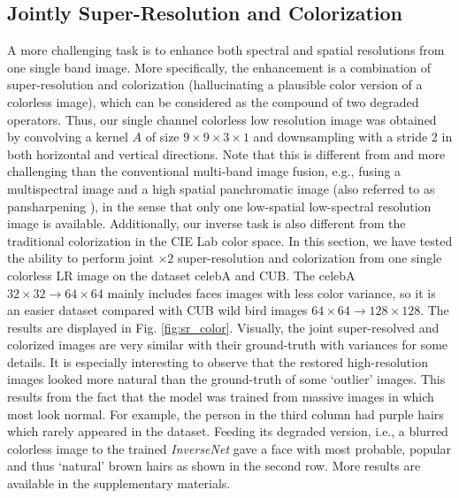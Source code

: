\documentclass[10pt,twocolumn,letterpaper]{article}
\begin{document}


\subsection{Jointly Super-Resolution and Colorization}

A more challenging task is to enhance both spectral and spatial resolutions from one single band image. 
More specifically, the enhancement is a combination of super-resolution and colorization (hallucinating a plausible color version of a colorless image), which can be considered as the compound of two degraded operators. 
Thus, our single channel colorless low resolution image was obtained by convolving a kernel $A$ of size $9 \times 9 \times 3 \times 1$ and downsampling with a stride 2 in both horizontal and vertical directions. Note that this is different from and more challenging than the conventional multi-band image fusion, e.g., fusing a multispectral image and a high spatial panchromatic image (also referred to as pansharpening \cite{Loncan2015}), in the sense that only one low-spatial low-spectral resolution image is available.  
Additionally, our inverse task is also different from the traditional colorization in the CIE Lab color space. %
In this section, we have tested the ability to perform joint $\times 2$ super-resolution and colorization from one single colorless LR image on the dataset celebA and CUB. 
The celebA $32\times 32\rightarrow 64\times 64$ mainly includes faces images with less color variance, so it is an easier dataset compared with CUB wild bird images $64\times 64\rightarrow 128\times 128$. The results are displayed in Fig. \ref{fig:sr_color}.
Visually, the joint super-resolved and colorized images are very similar with their ground-truth with variances for some details.
It is especially interesting to observe that the restored high-resolution images looked more natural than the ground-truth of 
some `outlier' images. This results from the fact that the model was trained from massive images in which most look normal.
For example, the person in the third column had purple hairs which rarely appeared in the dataset. Feeding its degraded version, i.e.,
a blurred colorless image to the trained \emph{InverseNet} gave a face with most probable, popular and thus `natural' brown hairs 
as shown in the second row. More results are available in the supplementary materials.
\end{document}
